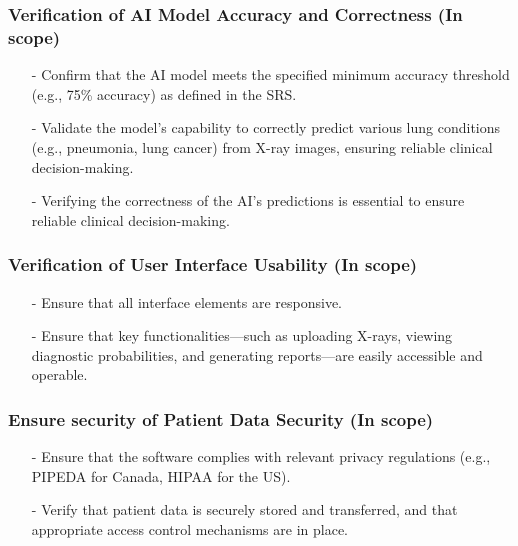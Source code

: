 \documentclass[12pt, titlepage]{article}
\begin{document}
    \subsubsection{Verification of AI Model Accuracy and Correctness (In scope)}
    \begin{itemize}
        \item[-] Confirm that the AI model meets the specified minimum accuracy threshold (e.g., 75\% accuracy) as defined in the SRS.
        \item[-] Validate the model’s capability to correctly predict various lung conditions (e.g., pneumonia, lung cancer) from X-ray images, ensuring reliable clinical decision-making.
        \item[-] Verifying the correctness of the AI's predictions is essential to ensure reliable clinical decision-making.
    \end{itemize}
    
    \subsubsection{Verification of User Interface Usability (In scope)}
    \begin{itemize}
        \item[-] Ensure that all interface elements are responsive.
        \item[-] Ensure that key functionalities—such as uploading X-rays, viewing diagnostic probabilities, and generating reports—are easily accessible and operable.
        
        
    \end{itemize}
    
    \subsubsection{Ensure security of Patient Data Security (In scope)}
    \begin{itemize}
        \item[-] Ensure that the software complies with relevant privacy regulations (e.g., PIPEDA for Canada, HIPAA for the US).
        \item[-] Verify that patient data is securely stored and transferred, and that appropriate access control mechanisms are in place.

    \end{itemize}
    
\end{document}
